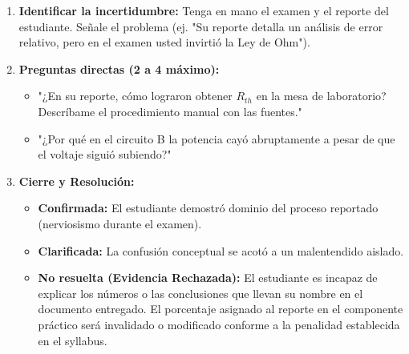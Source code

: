 \documentclass[11pt, a4paper]{article}
\begin{document}
\begin{enumerate}
    \item \textbf{Identificar la incertidumbre:} Tenga en mano el examen y el reporte del estudiante. Señale el problema (ej. "Su reporte detalla un análisis de error relativo, pero en el examen usted invirtió la Ley de Ohm").
    \item \textbf{Preguntas directas (2 a 4 máximo):} 
    \begin{itemize}
        \item "¿En su reporte, cómo lograron obtener $R_{th}$ en la mesa de laboratorio? Descríbame el procedimiento manual con las fuentes."
        \item "¿Por qué en el circuito B la potencia cayó abruptamente a pesar de que el voltaje siguió subiendo?"
    \end{itemize}
    \item \textbf{Cierre y Resolución:}
    \begin{itemize}
        \item \textbf{Confirmada:} El estudiante demostró dominio del proceso reportado (nerviosismo durante el examen).
        \item \textbf{Clarificada:} La confusión conceptual se acotó a un malentendido aislado.
        \item \textbf{No resuelta (Evidencia Rechazada):} El estudiante es incapaz de explicar los números o las conclusiones que llevan su nombre en el documento entregado. El porcentaje asignado al reporte en el componente práctico será invalidado o modificado conforme a la penalidad establecida en el syllabus.
    \end{itemize}
\end{enumerate}
\end{document}
